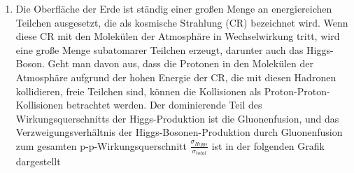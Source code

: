 \begin{enumerate}
{}

      			
   
          
\item Die Oberfläche der Erde ist ständig einer großen Menge an energiereichen Teilchen ausgesetzt, die als kosmische Strahlung (CR) bezeichnet wird. Wenn diese CR mit den Molekülen der Atmosphäre in Wechselwirkung tritt, wird eine große Menge subatomarer Teilchen erzeugt, darunter auch das Higgs-Boson. Geht man davon aus, dass die Protonen in den Molekülen der Atmosphäre aufgrund der hohen Energie der CR, die mit diesen Hadronen kollidieren, freie Teilchen sind, können die Kollisionen als Proton-Proton-Kollisionen betrachtet werden. Der dominierende Teil des Wirkungsquerschnitts der Higgs-Produktion ist die Gluonenfusion, und das Verzweigungsverhältnis der Higgs-Bosonen-Produktion durch Gluonenfusion zum gesamten p-p-Wirkungsquerschnitt $\frac{\sigma_{Higgs}}{\sigma_{total}}$ ist in der folgenden Grafik dargestellt


\end{enumerate}
